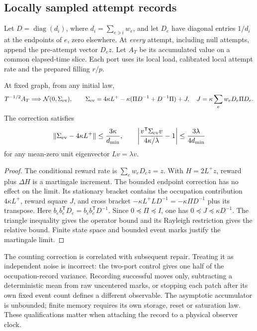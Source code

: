 \subsection{Locally sampled attempt records}
\label{subsec:native-event-records}
Let \(D=\operatorname{diag}(d_i)\), where
\(d_i=\sum_{e\ni i}w_e\), and let \(D_e\) have diagonal entries
\(1/d_i\) at the endpoints of \(e\), zero elsewhere. At \emph{every}
attempt, including null attempts, append the pre-attempt vector \(D_ez\).
Let \(A_T\) be its accumulated value on a common elapsed-time slice.
Each port uses its local load, calibrated local attempt rate and the
prepared filling \(r/p\).

\begin{theorem}
At fixed graph, from any initial law,
\[
 T^{-1/2}A_T\Longrightarrow\mathcal N(0,\Sigma_{\rm ev}),\qquad
 \Sigma_{\rm ev}=4\kappa L^+
 -\kappa(\Pi D^{-1}+D^{-1}\Pi)+J,
 \quad J=\kappa\sum_e w_eD_e\Pi D_e.
\]
The correction satisfies
\[
 \|\Sigma_{\rm ev}-4\kappa L^+\|\le\frac{3\kappa}{d_{\min}},
 \qquad
 \left|\frac{v^{\mathsf T}\Sigma_{\rm ev}v}{4\kappa/\lambda}-1\right|
 \le\frac{3\lambda}{4d_{\min}}
\]
for any mean-zero unit eigenvector \(Lv=\lambda v\).
\end{theorem}
\begin{proof}
The conditional reward rate is \(\sum_e w_eD_ez=z\). With
\(H=2L^+z\), reward plus \(\Delta H\) is a martingale increment.
The bounded endpoint correction has no effect on the limit. Its stationary
bracket contains the occupation contribution \(4\kappa L^+\), reward
square \(J\), and cross bracket
\(-\kappa L^+LD^{-1}=-\kappa\Pi D^{-1}\) plus its transpose.
Here \(b_eb_e^{\mathsf T}D_e=b_eb_e^{\mathsf T}D^{-1}\).
Since \(0\preceq\Pi\preceq I\), one has
\(0\preceq J\preceq\kappa D^{-1}\). The triangle inequality gives
the operator bound and its Rayleigh restriction gives the relative bound.
Finite state space and bounded event marks justify the martingale limit.
\end{proof}

The counting correction is correlated with subsequent repair. Treating it
as independent noise is incorrect: the two-port control gives one half
of the occupation-record variance. Recording successful moves only,
subtracting a deterministic mean from raw uncentered marks, or stopping
each patch after its own fixed event count defines a different observable.
The asymptotic accumulator is unbounded; finite memory requires its own
storage, reset or saturation law. These qualifications matter when
attaching the record to a physical observer clock.

